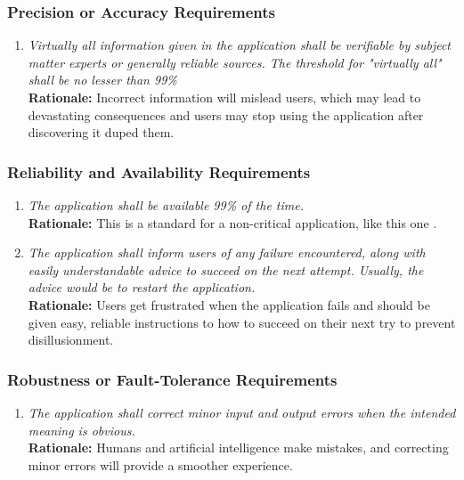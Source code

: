 \documentclass[]{article}
\begin{document}
\subsubsection{Precision or Accuracy Requirements}
\label{ssub:precision_or_accuracy_requirements}
\begin{enumerate}[{PR-PA}1. ]
	\item \textit{Virtually all information given in the application shall be verifiable by subject matter experts or generally reliable sources. The threshold for "virtually all" shall be no lesser than 99\% } \\ \textbf{Rationale:} Incorrect information will mislead users, which may lead to devastating consequences and users may stop using the application after discovering it duped them.
\end{enumerate}

\subsubsection{Reliability and Availability Requirements}
\label{ssub:reliability_and_availability_requirements}
\begin{enumerate}[{PR-RA}1. ]
	\item \textit{The application shall be available 99\% of the time.} \\ \textbf{Rationale:} This is a standard for a non-critical application, like this one \cite{ConcreteCMS}.
        \item \textit{The application shall inform users of any failure encountered, along with easily understandable advice to succeed on the next attempt. Usually, the advice would be to restart the application.} \\ \textbf{Rationale:} Users get frustrated when the application fails and should be given easy, reliable instructions to how to succeed on their next try to prevent disillusionment.
\end{enumerate}

\subsubsection{Robustness or Fault-Tolerance Requirements}
\label{ssub:robustness_or_fault_tolerance_requirements}
\begin{enumerate}[{PR-RFT}1. ]
	\item \textit{The application shall correct minor input and output errors when the intended meaning is obvious.} \\ \textbf{Rationale:} Humans and artificial intelligence make mistakes, and correcting minor errors will provide a smoother experience.
\end{enumerate}
\end{document}
